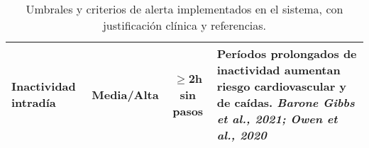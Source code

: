 \begin{table}[htbp]
\begin{tabularx}{\textwidth}{|l|c|c|X|}
        \hline
        Inactividad intradía & Media/Alta & $\geq$2h sin pasos & Períodos prolongados de inactividad aumentan riesgo cardiovascular y de caídas. \newline \textit{Barone Gibbs et al., 2021; Owen et al., 2020} \\
        \hline
    \end{tabularx}
    \caption{Umbrales y criterios de alerta implementados en el sistema, con justificación clínica y referencias.}
    \label{tab:anexo_umbrales_alertas}
\end{table}

